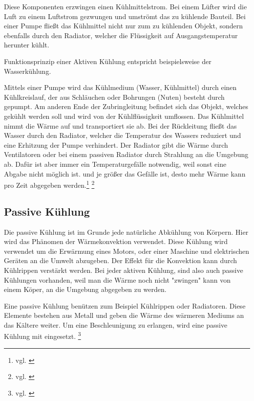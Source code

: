 Diese Komponenten erzwingen einen Kühlmittelstrom. 
Bei einem Lüfter wird die Luft zu einem Luftstrom gezwungen und umströmt das zu kühlende Bauteil. Bei einer Pumpe fließt das Kühlmittel nicht nur zum zu kühlenden Objekt, sondern ebenfalls durch den Radiator, welcher die Flüssigkeit auf Ausgangstemperatur herunter kühlt. 


Funktionsprinzip einer Aktiven Kühlung entspricht beispielsweise der Wasserkühlung.

Mittels einer Pumpe wird das Kühlmedium (Wasser, Kühlmittel) durch einen Kühlkreislauf, der aus Schläuchen oder Bohrungen (Nuten) besteht durch gepumpt. Am anderen Ende der Zubringleitung befindet sich das Objekt, welches gekühlt werden soll und wird von der Kühlflüssigkeit umflossen. 
Das Kühlmittel nimmt die Wärme auf und transportiert sie ab. Bei der Rückleitung fließt das Wasser durch den Radiator, welcher die Temperatur des Wassers reduziert und eine Erhitzung der Pumpe verhindert. 
Der Radiator gibt die Wärme durch Ventilatoren oder bei einem passiven Radiator durch Strahlung an die Umgebung ab. Dafür ist aber immer ein Temperaturgefälle notwendig, weil sonst eine Abgabe nicht möglich ist. und je größer das Gefälle ist, desto mehr Wärme kann pro Zeit abgegeben werden.\footnote{vgl. \cite{Luftkuehlung1}} \footnote{vgl. \cite{Luftkuehlung2}}

\subsection{Passive Kühlung} 

Die passive Kühlung ist im Grunde jede natürliche Abkühlung von Körpern. Hier wird das Phänomen der Wärmekonvektion verwendet. Diese Kühlung wird verwendet um die Erwärmung eines Motors, oder einer Maschine und elektrischen Geräten an die Umwelt abzugeben. Der Effekt für die Konvektion kann durch Kühlrippen verstärkt werden. Bei jeder aktiven Kühlung, sind also auch passive Kühlungen vorhanden, weil man die Wärme noch nicht "zwingen" kann von einem Köper, an die Umgebung abgegeben zu werden. 

Eine passive Kühlung benützen zum Beispiel Kühlrippen oder Radiatoren. Diese Elemente bestehen aus Metall und geben die Wärme des wärmeren Mediums an das Kältere weiter. Um eine Beschleunigung zu erlangen, wird eine passive Kühlung mit eingesetzt. \footnote{vgl. \cite{PassiveKuehlung}}


\newpage

